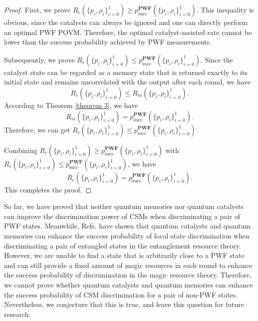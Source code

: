 \documentclass[aps,pra,twocolumn,floatfix,amsfonts,10pt]{revtex4-2}
\begin{document}
\begin{proof}
	First, we prove $R_c\left(\{p_i,\rho_i\}_{i=0}^{1}\right) \geqslant p_{\mathrm{succ}}^{\mathbf{PWF}}\left(\{p_i,\rho_i\}_{i=0}^{1}\right)$.
	This inequality is obvious, since the catalysts can always be ignored and one can directly perform an optimal PWF POVM. 
	Therefore, the optimal catalyst-assisted rate cannot be lower than the success probability achieved by PWF measurements.
	
	Subsequently, we prove $R_c\left(\{p_i,\rho_i\}_{i=0}^{1}\right) \leqslant p_{\mathrm{succ}}^{\mathbf{PWF}}\left(\{p_i,\rho_i\}_{i=0}^{1}\right)$.
	Since the catalyst state can be regarded as a memory state that is returned exactly to its initial state and remains uncorrelated with the output after each round, we have
	\begin{equation}
		R_c\left(\{p_i,\rho_i\}_{i=0}^{1}\right) \leqslant R_m\left(\{p_i,\rho_i\}_{i=0}^{1}\right).
	\end{equation}
	According to Theorem \ref{theorem 3}, we have
	\begin{equation}
		R_m\left(\{p_i,\rho_i\}_{i=0}^{1}\right) = p_{\mathrm{succ}}^{\mathbf{PWF}}\left(\{p_i,\rho_i\}_{i=0}^{1}\right).
	\end{equation}
	Therefore, we can get $R_c\left(\{p_i,\rho_i\}_{i=0}^{1}\right) \leqslant p_{\mathrm{succ}}^{\mathbf{PWF}}\left(\{p_i,\rho_i\}_{i=0}^{1}\right)$.

	Combining $R_c\left(\{p_i,\rho_i\}_{i=0}^{1}\right) \geqslant p_{\mathrm{succ}}^{\mathbf{PWF}}\left(\{p_i,\rho_i\}_{i=0}^{1}\right)$ with $R_c\left(\{p_i,\rho_i\}_{i=0}^{1}\right) \leqslant p_{\mathrm{succ}}^{\mathbf{PWF}}\left(\{p_i,\rho_i\}_{i=0}^{1}\right)$, we have
	\begin{equation}
		R_c\left(\{p_i,\rho_i\}_{i=0}^{1}\right) = p_{\mathrm{succ}}^{\mathbf{PWF}}\left(\{p_i,\rho_i\}_{i=0}^{1}\right).
	\end{equation}
	This completes the proof.
\end{proof}

So far, we have proved that neither quantum memories nor quantum catalysts can improve the discrimination power of CSMs when discriminating a pair of PWF states. 
Meanwhile, Refs. \cite{SLN+2022,PS2025,YDY2012} have shown that quantum catalysts and quantum memories can enhance the success probability of local state discrimination when discriminating a pair of entangled states in the entanglement resource theory. 
However, we are unable to find a state that is arbitrarily close to a PWF state and can still provide a fixed amount of magic resources in each round to enhance the success probability of discrimination in the magic resource theory. 
Therefore, we cannot prove whether quantum catalysts and quantum memories can enhance the success probability of CSM discrimination for a pair of non-PWF states. 
Nevertheless, we conjecture that this is true, and leave this question for future research.
\end{document}

